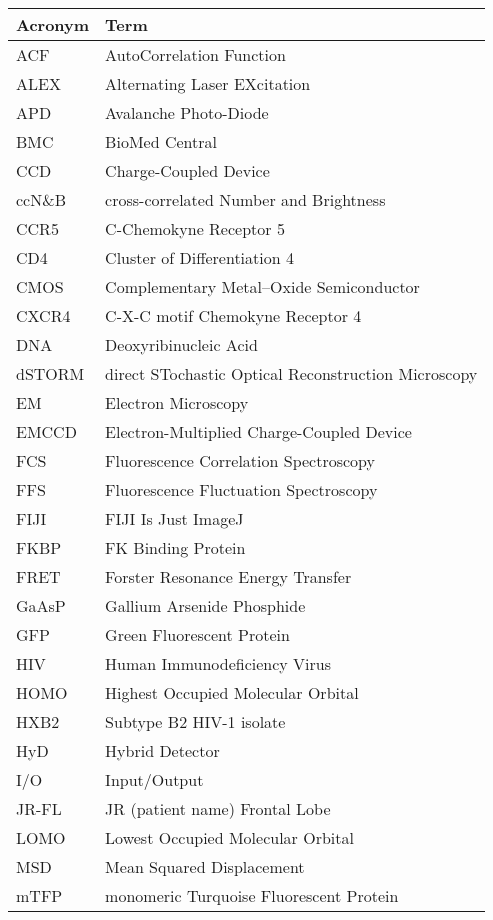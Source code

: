 \documentclass[12pt,]{book}
\theoremstyle{definition}
\theoremstyle{definition}
\theoremstyle{definition}
\theoremstyle{remark}
\begin{document}
\begin{longtable}{l|l}
\hline
Acronym & Term\\
\hline
ACF & AutoCorrelation Function\\
\hline
ALEX & Alternating Laser EXcitation\\
\hline
APD & Avalanche Photo-Diode\\
\hline
BMC & BioMed Central\\
\hline
CCD & Charge-Coupled Device\\
\hline
ccN\&B & cross-correlated Number and Brightness\\
\hline
CCR5 & C-Chemokyne Receptor 5\\
\hline
CD4 & Cluster of Differentiation 4\\
\hline
CMOS & Complementary Metal–Oxide Semiconductor\\
\hline
CXCR4 & C-X-C motif Chemokyne Receptor 4\\
\hline
DNA & Deoxyribinucleic Acid\\
\hline
dSTORM & direct STochastic Optical Reconstruction Microscopy\\
\hline
EM & Electron Microscopy\\
\hline
EMCCD & Electron-Multiplied Charge-Coupled Device\\
\hline
FCS & Fluorescence Correlation Spectroscopy\\
\hline
FFS & Fluorescence Fluctuation Spectroscopy\\
\hline
FIJI & FIJI Is Just ImageJ\\
\hline
FKBP & FK Binding Protein\\
\hline
FRET & Forster Resonance Energy Transfer\\
\hline
GaAsP & Gallium Arsenide Phosphide\\
\hline
GFP & Green Fluorescent Protein\\
\hline
HIV & Human Immunodeficiency Virus\\
\hline
HOMO & Highest Occupied Molecular Orbital\\
\hline
HXB2 & Subtype B2 HIV-1 isolate\\
\hline
HyD & Hybrid Detector\\
\hline
I/O & Input/Output\\
\hline
JR-FL & JR (patient name) Frontal Lobe\\
\hline
LOMO & Lowest Occupied Molecular Orbital\\
\hline
MSD & Mean Squared Displacement\\
\hline
mTFP & monomeric Turquoise Fluorescent Protein\\

\end{longtable}
\end{document}
